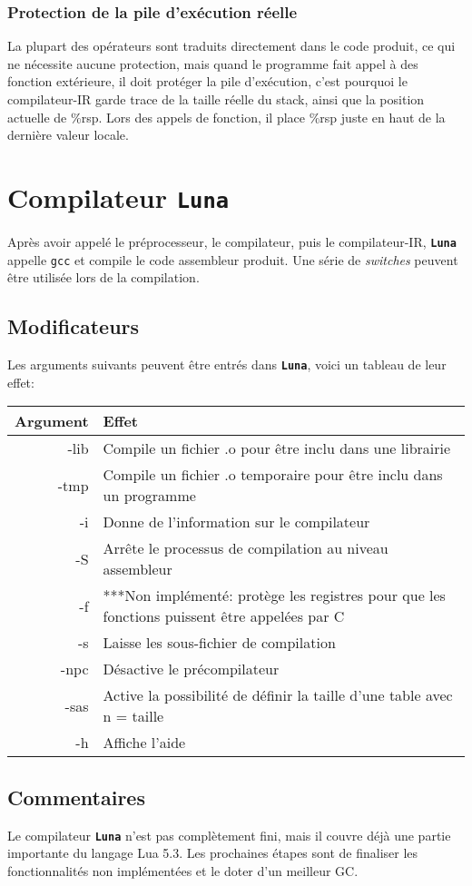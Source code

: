 \documentclass{article}
\newcommand{\luna}{\textbf{\texttt{Luna}}}
\newcommand{\R}[1]{\%{}{#1}}
\begin{document}
\subsubsection{Protection de la pile d'exécution réelle}
La plupart des opérateurs sont traduits directement dans le code produit, ce qui ne nécessite aucune protection, mais quand le programme fait appel à des fonction extérieure, il doit protéger la pile d'exécution, c'est pourquoi le compilateur-IR garde trace de la taille réelle du stack, ainsi que la position actuelle de \R{rsp}. Lors des appels de fonction, il place \R{rsp} juste en haut de la dernière valeur locale.

\newpage
\section{Compilateur \luna{}}
Après avoir appelé le préprocesseur, le compilateur, puis le compilateur-IR, \luna{} appelle \texttt{gcc} et compile le code assembleur produit. Une série de \textit{switches} peuvent être utilisée lors de la compilation.

\subsection{Modificateurs}
Les arguments suivants peuvent être entrés dans \luna{}, voici un tableau de leur effet:
\begin{center}
  \begin{tabular}{r|p{12cm}}
    Argument & Effet \\
    \hline
    -lib & Compile un fichier .o pour être inclu dans une librairie\\
    \hline
    -tmp & Compile un fichier .o temporaire pour être inclu dans un programme\\
    \hline
    -i & Donne de l'information sur le compilateur\\
    \hline
    -S & Arrête le processus de compilation au niveau assembleur\\
    \hline
    -f & {\color{red}***Non implémenté: protège les registres pour que les fonctions puissent être appelées par C}\\
    \hline
    -s & Laisse les sous-fichier de compilation\\
    \hline
    -npc & Désactive le précompilateur\\
    \hline
    -sas & Active la possibilité de définir la taille d'une table avec { n = taille }\\
    \hline
    -h & Affiche l'aide\\
  \end{tabular}
\end{center}

\subsection{Commentaires}
Le compilateur \luna{} n'est pas complètement fini, mais il couvre déjà une partie importante du langage Lua 5.3. Les prochaines étapes sont de finaliser les fonctionnalités non implémentées et le doter d'un meilleur GC.
\end{document}
